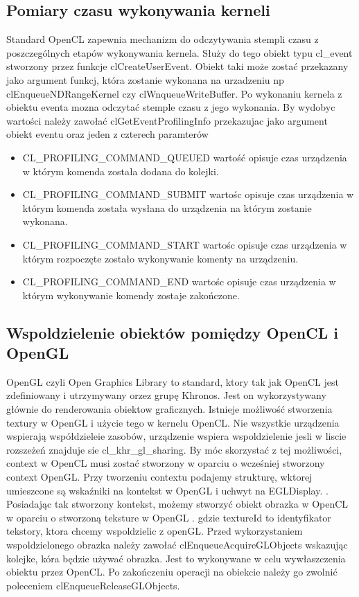 \subsection{Pomiary czasu wykonywania kerneli}
 Standard OpenCL zapewnia mechanizm do odczytywania stempli czasu z poszczególnych etapów wykonywania kernela. Służy do tego obiekt typu cl\_event stworzony przez funkcje clCreateUserEvent. Obiekt taki może zostać przekazany jako argument funkcj, która zostanie wykonana na urzadzeniu np clEnqueueNDRangeKernel czy clWnqueueWriteBuffer.
 Po wykonaniu kernela z obiektu eventa mozna odczytać stemple czasu z jego wykonania. By wydobyc wartości należy zawołać clGetEventProfilingInfo przekazujac jako argument obiekt eventu oraz jeden z czterech paramterów 
 \begin{itemize}
     \item CL\_PROFILING\_COMMAND\_QUEUED wartość opisuje czas urządzenia w którym komenda została dodana do kolejki.
     \item CL\_PROFILING\_COMMAND\_SUBMIT wartośc opisuje czas urządzenia w którym komenda została wysłana do urządzenia na którym zostanie wykonana.
     \item CL\_PROFILING\_COMMAND\_START wartośc opisuje czas urządzenia w którym rozpoczęte zostało wykonywanie komenty na urządzeniu.
     \item CL\_PROFILING\_COMMAND\_END wartośc opisuje czas urządzenia w którym wykonywanie komendy zostaje zakończone.
\end{itemize}
\subsection [Wspoldzielenie obiektów pomiędzy OpenCL i OpenGL]{Wspoldzielenie obiektów pomiędzy OpenCL i OpenGL}
OpenGL czyli Open Graphics Library to standard, ktory tak jak OpenCL jest zdefiniowany i utrzymywany orzez grupę Khronos. Jest on wykorzystywany głównie do renderowania obiektow graficznych.
Istnieje możliwość stworzenia textury w OpenGL i użycie tego w kernelu OpenCL. Nie wszystkie urządzenia wspierają współdzieleie zasobów, urządzenie wspiera wspoldzielenie jesli w liscie rozszeżeń znajduje sie cl\_khr\_gl\_sharing. By móc skorzystać z tej możliwości, context w OpenCL musi zostać stworzony w oparciu o wcześniej stworzony context OpenGL. Przy tworzeniu contextu podajemy strukturę, wktorej umieszcone są wskaźniki na kontekst w OpenGL i uchwyt na EGLDisplay. 
 .
 Posiadając tak stworzony kontekst, możemy stworzyć obiekt obrazka w OpenCL w oparciu o stworzoną teksture w OpenGL
 . gdzie textureId to identyfikator tekstory, ktora chcemy wspoldzielic z openGL. 
 Przed wykorzystaniem wspoldzielonego obrazka należy zawołać clEnqueueAcquireGLObjects wskazując kolejke, kóra będzie używać obrazka. Jest to wykonywane w celu wywłaszczenia obiektu przez OpenCL. Po zakończeniu operacji na obiekcie należy go zwolnić poleceniem clEnqueueReleaseGLObjects.

